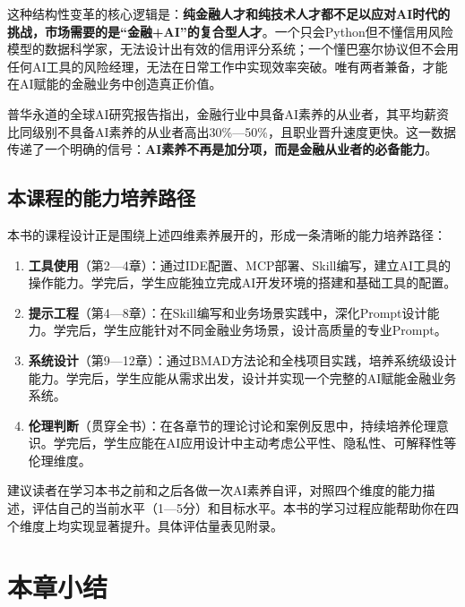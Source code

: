 这种结构性变革的核心逻辑是：\textbf{纯金融人才和纯技术人才都不足以应对AI时代的挑战，市场需要的是``金融+AI''的复合型人才}。一个只会Python但不懂信用风险模型的数据科学家，无法设计出有效的信用评分系统；一个懂巴塞尔协议但不会用任何AI工具的风险经理，无法在日常工作中实现效率突破。唯有两者兼备，才能在AI赋能的金融业务中创造真正价值。

普华永道的全球AI研究报告指出，金融行业中具备AI素养的从业者，其平均薪资比同级别不具备AI素养的从业者高出30\%—50\%，且职业晋升速度更快\parencite{pwc2023ai}。这一数据传递了一个明确的信号：\textbf{AI素养不再是加分项，而是金融从业者的必备能力}。

\subsection{本课程的能力培养路径}

本书的课程设计正是围绕上述四维素养展开的，形成一条清晰的能力培养路径：

\begin{enumerate}[leftmargin=2em]
  \item \textbf{工具使用}（第2—4章）：通过IDE配置、MCP部署、Skill编写，建立AI工具的操作能力。学完后，学生应能独立完成AI开发环境的搭建和基础工具的配置。
  \item \textbf{提示工程}（第4—8章）：在Skill编写和业务场景实践中，深化Prompt设计能力。学完后，学生应能针对不同金融业务场景，设计高质量的专业Prompt。
  \item \textbf{系统设计}（第9—12章）：通过BMAD方法论和全栈项目实践，培养系统级设计能力。学完后，学生应能从需求出发，设计并实现一个完整的AI赋能金融业务系统。
  \item \textbf{伦理判断}（贯穿全书）：在各章节的理论讨论和案例反思中，持续培养伦理意识。学完后，学生应能在AI应用设计中主动考虑公平性、隐私性、可解释性等伦理维度。
\end{enumerate}

\begin{notebox}[自我评估建议]
建议读者在学习本书之前和之后各做一次AI素养自评，对照四个维度的能力描述，评估自己的当前水平（1—5分）和目标水平。本书的学习过程应能帮助你在四个维度上均实现显著提升。具体评估量表见附录。
\end{notebox}


\section*{本章小结}

